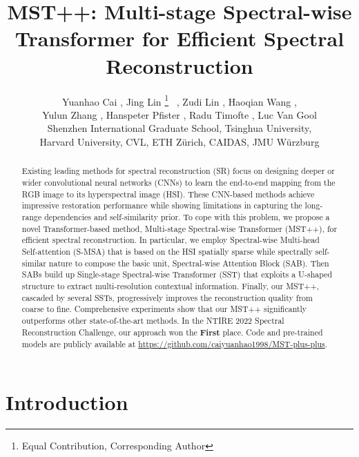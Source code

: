 \documentclass[10pt,twocolumn,letterpaper]{article}
\begin{document}
\title{MST++: Multi-stage Spectral-wise\\ Transformer for Efficient Spectral Reconstruction}

\author{Yuanhao Cai , Jing Lin \thanks{Equal Contribution,  Corresponding Author} ~, Zudi Lin , Haoqian Wang ,\\  Yulun Zhang , Hanspeter Pfister , Radu Timofte ,  Luc Van Gool  \\
	 Shenzhen International Graduate School, Tsinghua University, \\ Harvard University,  CVL, ETH Z\"{u}rich,  CAIDAS, JMU W\"urzburg
}
\maketitle

\begin{abstract}
Existing leading methods for spectral reconstruction (SR) focus on designing deeper or wider convolutional neural networks (CNNs) to learn the end-to-end mapping from the RGB image to its hyperspectral image (HSI). These CNN-based methods achieve impressive restoration performance while showing limitations in capturing the long-range dependencies and self-similarity prior. To cope with this problem, we propose a novel Transformer-based method, Multi-stage Spectral-wise Transformer (MST++),  for efficient spectral reconstruction. In particular, we employ Spectral-wise Multi-head Self-attention (S-MSA) that is based on the HSI spatially sparse while spectrally self-similar nature to compose the basic unit, Spectral-wise Attention Block (SAB). Then SABs build up Single-stage Spectral-wise Transformer (SST) that exploits a U-shaped structure to extract multi-resolution contextual information. Finally, our MST++, cascaded by several SSTs, progressively improves the reconstruction quality from coarse to fine. Comprehensive experiments show that our MST++ significantly outperforms other state-of-the-art methods. In the NTIRE 2022 Spectral Reconstruction Challenge,
our approach won the \textbf{First} place. Code and pre-trained models are publicly available at \url{https://github.com/caiyuanhao1998/MST-plus-plus}. 

\end{abstract}

\section{Introduction}
\end{document}
